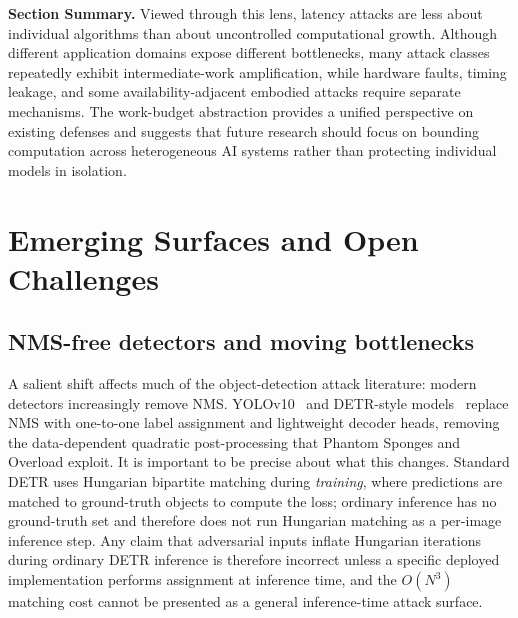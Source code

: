 \documentclass[acmsmall,screen,review,nonacm]{acmart}
\begin{document}
\textbf{Section Summary.}
Viewed through this lens, latency attacks are less about individual algorithms than about uncontrolled computational growth. Although different application domains expose different bottlenecks, many attack classes repeatedly exhibit intermediate-work amplification, while hardware faults, timing leakage, and some availability-adjacent embodied attacks require separate mechanisms. The work-budget abstraction provides a unified perspective on existing defenses and suggests that future research should focus on bounding computation across heterogeneous AI systems rather than protecting individual models in isolation.


\section{Emerging Surfaces and Open Challenges}
\label{sec:open}

\subsection{NMS-free detectors and moving bottlenecks}
\label{sec:nmsfree}

A salient shift affects much of the object-detection attack literature: modern detectors increasingly remove NMS. YOLOv10~\cite{wang2024yolov10} and DETR-style models~\cite{carion2020detr} replace NMS with one-to-one label assignment and lightweight decoder heads, removing the data-dependent quadratic post-processing that Phantom Sponges and Overload exploit. It is important to be precise about what this changes. Standard DETR uses Hungarian bipartite matching during \emph{training}, where predictions are matched to ground-truth objects to compute the loss; ordinary inference has no ground-truth set and therefore does not run Hungarian matching as a per-image inference step. Any claim that adversarial inputs inflate Hungarian iterations during ordinary DETR inference is therefore incorrect unless a specific deployed implementation performs assignment at inference time, and the $O(N^3)$ matching cost cannot be presented as a general inference-time attack surface.
\end{document}
